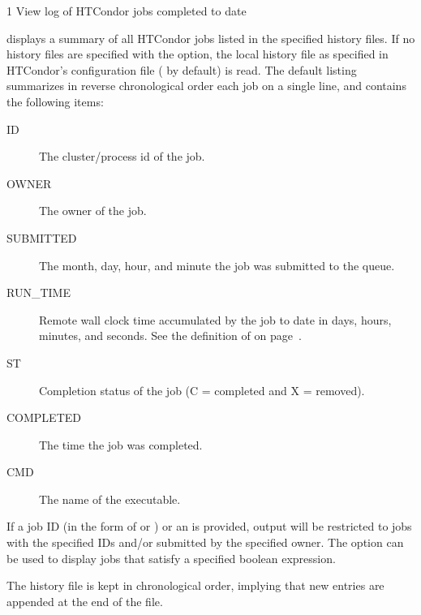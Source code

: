 \begin{ManPage}{\label{man-condor-history}}{1}
{View log of HTCondor jobs completed to date}
\Synopsis
{}


\Description
{} displays a summary of all HTCondor jobs listed in the
specified history files.
If no history files are specified with the  option, 
the local history file as specified in HTCondor's configuration file
( by default) is read.  
The default listing summarizes in reverse chronological order
each job on a single line, and  contains the following items:


\begin{description}
\item[ID] The cluster/process id of the job. 
\item[OWNER] The owner of the job. 
\item[SUBMITTED] The month, day, hour, and minute the job was submitted to the queue. 
\item[RUN\_TIME] Remote wall clock time accumulated by the job to date in days, hours, minutes, and seconds.  See the definition of
 on page~\pageref{RemoteWallClockTime}.
\item[ST] Completion status of the job (C = completed and X = removed).
\item[COMPLETED] The time the job was completed.
\item[CMD] The name of the executable. 
\end{description}

If a job ID (in the form of  or ) or an
 is provided, output will be restricted to jobs with the
specified IDs and/or submitted by the specified owner.  
The  option can be used to display jobs that satisfy a
specified boolean expression.

The history file is kept in chronological order,
implying that new entries are appended at the end of the
file.


\end{ManPage}
